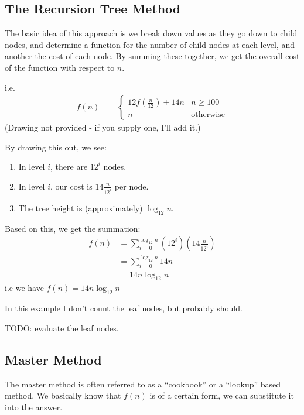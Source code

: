         \subsection{The Recursion Tree Method}
            The basic idea of this approach is we break down values as they go
            down to child nodes, and determine a function for the number of
            child nodes at each level, and another the cost of each node. By
            summing these together, we get the overall cost of the function with
            respect to $n$.

            i.e.
            \begin{align*}
                f(n) &= \left\{
                    \begin{array}{lr}
                        12 f\left(\frac{n}{12}\right) + 14n & n \ge 100 \\
                        n & \text{otherwise}
                    \end{array}
                \right.
            \end{align*}
            (Drawing not provided - if you supply one, I'll add it.)

            By drawing this out, we see:
            \begin{enumerate}
                \item In level $i$, there are $12^i$ nodes.
                \item In level $i$, our cost is $14 \frac{n}{12^i}$ per node.
                \item The tree height is (approximately) $\log_{12}n$.
            \end{enumerate}

            Based on this, we get the summation:
            \begin{align*}
                f(n) &= \sum_{i=0}^{\log_{12}n} (12^i)(14 \frac{n}{12^i}) \\
                &= \sum_{i=0}^{\log_{12}n} 14 n \\
                &= 14 n \log_{12}n
            \end{align*}
            i.e we have $f(n) = 14 n \log_{12}n$

            In this example I don't count the leaf nodes, but probably should.

            TODO: evaluate the leaf nodes.
        \subsection{Master Method}
            The master method is often referred to as a ``cookbook'' or a
            ``lookup'' based method. We basically know that $f(n)$ is of a
            certain form, we can substitute it into the answer.

